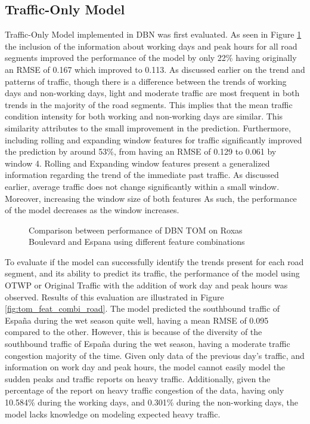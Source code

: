 \subsection{Traffic-Only Model}
Traffic-Only Model implemented in DBN was first evaluated. 
As seen in Figure \ref{fig:tom_diff_feat_combi} the inclusion of the information about working days and peak hours for all road segments improved the performance of the model by only 22\% having originally an RMSE of 0.167 which improved to 0.113. As discussed earlier on the trend and patterns of traffic, though there is a difference between the trends of working days and non-working days, light and moderate traffic are most frequent in both trends in the majority of the road segments. This implies that the mean traffic condition intensity for both working and non-working days are similar. This similarity attributes to the small improvement in the prediction. Furthermore, including rolling and expanding window features for traffic significantly improved the prediction by around 53\%, from having an RMSE of 0.129 to 0.061 by window 4. Rolling and Expanding window features present a generalized information regarding the trend of the immediate past traffic. As discussed earlier, average traffic does not change significantly within a small window. Moreover, increasing the window size of both features As such, the performance of the model decreases as the window increases. 

\begin{figure}[!t]
  \centering
  \captionsetup{justification=centering}
  \caption{Comparison between performance of DBN TOM on Roxas Boulevard and Espana using different feature combinations}
  \label{fig:tom_diff_feat_combi}
\end{figure}

To evaluate if the model can successfully identify the trends present for each road segment, and its ability to predict its traffic, the performance of the model using OTWP or Original Traffic with the addition of work day and peak hours was observed. Results of this evaluation are illustrated in Figure \ref{fig:tom_feat_combi_road}. The model predicted the southbound traffic of España during the wet season quite well, having a mean RMSE of 0.095 compared to the other. However, this is because of the diversity of the southbound traffic of España during the wet season, having a moderate traffic congestion majority of the time. Given only data of the previous day’s traffic, and information on work day and peak hours, the model cannot easily model the sudden peaks and traffic reports on heavy traffic. Additionally, given the percentage of the report on heavy traffic congestion of the data, having only 10.584\% during the working days, and 0.301\% during the non-working days, the model lacks knowledge on modeling expected heavy traffic. 

